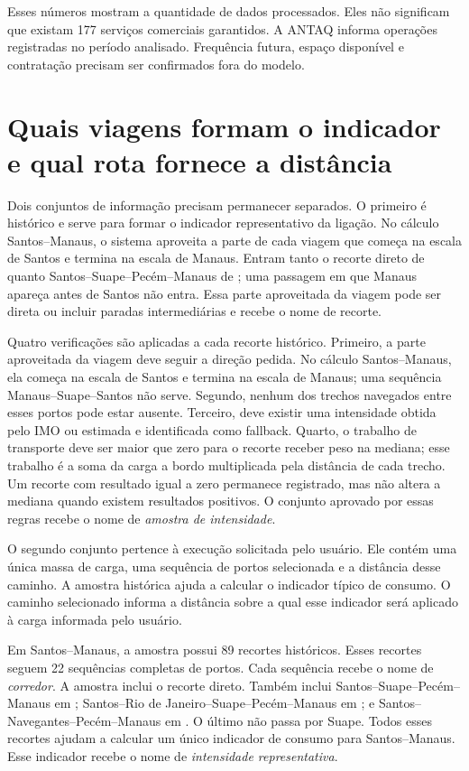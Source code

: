 Esses números mostram a quantidade de dados processados. Eles não significam que existam 177 serviços comerciais garantidos. A ANTAQ informa operações registradas no período analisado. Frequência futura, espaço disponível e contratação precisam ser confirmados fora do modelo.

\section{Quais viagens formam o indicador e qual rota fornece a distância}
\label{sec:corredores-portos-discussao}

Dois conjuntos de informação precisam permanecer separados. O primeiro é histórico e serve para formar o indicador representativo da ligação. No cálculo Santos--Manaus, o sistema aproveita a parte de cada viagem que começa na escala de Santos e termina na escala de Manaus. Entram tanto o recorte direto de  quanto Santos--Suape--Pecém--Manaus de ; uma passagem em que Manaus apareça antes de Santos não entra. Essa parte aproveitada da viagem pode ser direta ou incluir paradas intermediárias e recebe o nome de recorte.

Quatro verificações são aplicadas a cada recorte histórico. Primeiro, a parte aproveitada da viagem deve seguir a direção pedida. No cálculo Santos--Manaus, ela começa na escala de Santos e termina na escala de Manaus; uma sequência Manaus--Suape--Santos não serve. Segundo, nenhum dos trechos navegados entre esses portos pode estar ausente. Terceiro, deve existir uma intensidade obtida pelo IMO ou estimada e identificada como fallback. Quarto, o trabalho de transporte deve ser maior que zero para o recorte receber peso na mediana; esse trabalho é a soma da carga a bordo multiplicada pela distância de cada trecho. Um recorte com resultado igual a zero permanece registrado, mas não altera a mediana quando existem resultados positivos. O conjunto aprovado por essas regras recebe o nome de \emph{amostra de intensidade}.

O segundo conjunto pertence à execução solicitada pelo usuário. Ele contém uma única massa de carga, uma sequência de portos selecionada e a distância desse caminho. A amostra histórica ajuda a calcular o indicador típico de consumo. O caminho selecionado informa a distância sobre a qual esse indicador será aplicado à carga informada pelo usuário.

Em Santos--Manaus, a amostra possui 89 recortes históricos. Esses recortes seguem 22 sequências completas de portos. Cada sequência recebe o nome de \emph{corredor}. A amostra inclui o recorte direto. Também inclui Santos--Suape--Pecém--Manaus em ; Santos--Rio de Janeiro--Suape--Pecém--Manaus em ; e Santos--Navegantes--Pecém--Manaus em . O último não passa por Suape. Todos esses recortes ajudam a calcular um único indicador de consumo para Santos--Manaus. Esse indicador recebe o nome de \emph{intensidade representativa}.

